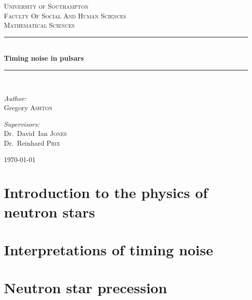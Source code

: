 \documentclass[twoside]{ecsthesis}
\begin{document}
\def\biblio{}

\begin{titlepage}
\newcommand{\HRule}{\rule{\linewidth}{0.5mm}}
\begin{center}

\textsc{\LARGE University of Southampton}\\[0.2cm]
\textsc{\Large Faculty Of Social And Human Sciences}\\[0.2cm]
\textsc{\Large Mathematical Sciences}\\[1.5cm]

\HRule \\[0.4cm]
{ \huge \bfseries Timing noise in pulsars \\[0.4cm] }

\HRule \\[1.5cm]

\noindent
\begin{minipage}{0.4\textwidth}
\begin{flushleft} \large
\emph{Author:}\\
Gregory \textsc{Ashton}
\end{flushleft}
\end{minipage}%
\begin{minipage}{0.4\textwidth}
\begin{flushright} \large
\emph{Supervisors:} \\
Dr.~David~Ian \textsc{Jones} \\
Dr.~Reinhard \textsc{Prix}
\end{flushright}
\end{minipage}

\vfill

{\large \today}
\end{center}
\end{titlepage}

\tableofcontents

\chapter{Introduction to the physics of neutron stars}
\label{sec: neutron star physics}


\chapter{Interpretations of timing noise}

\chapter{Neutron star precession}
\end{document}
